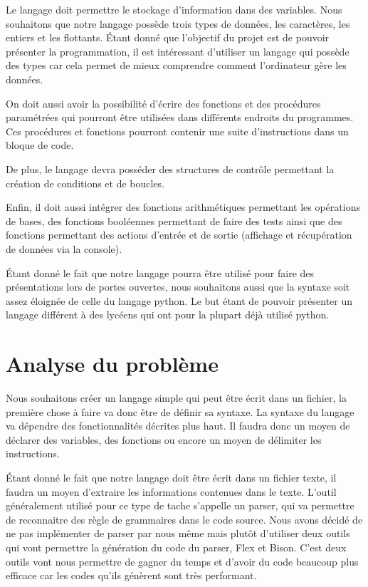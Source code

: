 \documentclass[a4paper]{article}%
\begin{document}
Le langage doit permettre le stockage d'information dans des variables. Nous
souhaitons que notre langage possède trois types de données, les caractères, les
entiers et les flottants. Étant donné que l'objectif du projet est de pouvoir
présenter la programmation, il est intéressant d'utiliser un langage qui possède
des types car cela permet de mieux comprendre comment l'ordinateur gère les
données.

On doit aussi avoir la possibilité d'écrire des fonctions et des procédures
paramétrées qui pourront être utilisées dans différents endroits du programmes.
Ces procédures et fonctions pourront contenir une suite d'instructions dans un
bloque de code.

De plus, le langage devra posséder des structures de contrôle permettant la
création de conditions et de boucles.

Enfin, il doit aussi intégrer des fonctions arithmétiques permettant les
opérations de bases, des fonctions booléennes permettant de faire des
tests ainsi que des fonctions permettant des actions d'entrée et de sortie
(affichage et récupération de données via la console).

Étant donné le fait que notre langage pourra être utilisé pour faire des
présentations lors de portes ouvertes, nous souhaitons aussi que la syntaxe soit
assez éloignée de celle du langage python. Le but étant de pouvoir présenter
un langage différent à des lycéens qui ont pour la plupart déjà utilisé python.

\section{Analyse du problème}

Nous souhaitons créer un langage simple qui peut être écrit dans un fichier, la
première chose à faire va donc être de définir sa syntaxe. La syntaxe du langage
va dépendre des fonctionnalités décrites plus haut. Il faudra donc un moyen de
déclarer des variables, des fonctions ou encore un moyen de délimiter les
instructions.

Étant donné le fait que notre langage doit être écrit dans un fichier texte, il
faudra un moyen d'extraire les informations contenues dans le texte. L'outil
généralement utilisé pour ce type de tache s'appelle un \gls{parser}, qui va
permettre de reconnaitre des règle de grammaires dans le code source. Nous avons
décidé de ne pas implémenter de \gls{parser} par nous même mais plutôt d'utiliser
deux outils qui vont permettre la génération du code du \gls{parser}, Flex et Bison.
C'est deux outils vont nous permettre de gagner du temps et d'avoir du code
beaucoup plus efficace car les codes qu'ils génèrent sont très performant.
\end{document}
